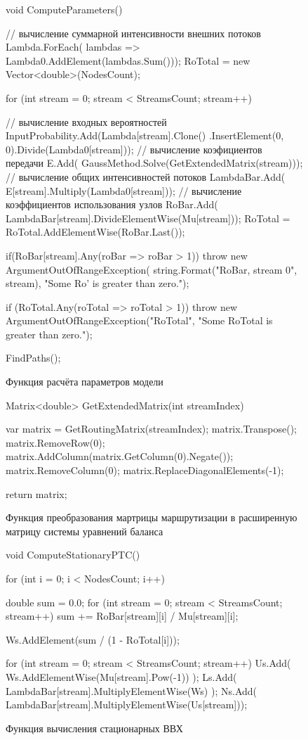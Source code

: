 \documentclass[oneside, draft, 14pt, a4paper]{extreport}
\begin{document}
\begin{figure}[h!]
    \begin{listing}{1}
void ComputeParameters()
{
  // вычисление суммарной интенсивности внешних потоков
  Lambda.ForEach(
	lambdas => Lambda0.AddElement(lambdas.Sum())); 
  RoTotal = new Vector<double>(NodesCount);

  for (int stream = 0; stream < StreamsCount; stream++)
  {
	// вычисление входных вероятностей
	InputProbability.Add(Lambda[stream].Clone()
	  .InsertElement(0, 0).Divide(Lambda0[stream]));
	// вычисление коэфициентов передачи
	E.Add(
	  GaussMethod.Solve(GetExtendedMatrix(stream)));
	// вычисление общих интенсивностей потоков
	LambdaBar.Add(
	  E[stream].Multiply(Lambda0[stream]));
	// вычисление коэффициентов использования узлов
	RoBar.Add(
	  LambdaBar[stream].DivideElementWise(Mu[stream]));
	RoTotal = RoTotal.AddElementWise(RoBar.Last());
	
  	if(RoBar[stream].Any(roBar => roBar > 1))
	  throw new ArgumentOutOfRangeException(
	  string.Format("RoBar, stream {0}", stream),
	  "Some Ro' is greater than zero.");
  }
  if (RoTotal.Any(roTotal => roTotal > 1))
	throw new ArgumentOutOfRangeException("RoTotal",
	"Some RoTotal is greater than zero.");
	
	FindPaths();
}\end{listing}
	
	\caption{Функция расчёта параметров модели}
	\label{pic:function_computeParameters}
\end{figure}

\begin{figure}[h!]
    \begin{listing}{1}
Matrix<double> GetExtendedMatrix(int streamIndex)
{
  var matrix = GetRoutingMatrix(streamIndex);
  matrix.Transpose();
  matrix.RemoveRow(0);
  matrix.AddColumn(matrix.GetColumn(0).Negate());
  matrix.RemoveColumn(0);
  matrix.ReplaceDiagonalElements(-1);

  return matrix;
}\end{listing}
    
    \caption{Функция преобразования мартрицы маршрутизации в расширенную матрицу системы уравнений баланса}
    \label{pic:functions_getextendedmatrix}
\end{figure}

\begin{figure}[h!]
	\begin{listing}{1}
void ComputeStationaryPTC()
{
  for (int i = 0; i < NodesCount; i++)
  {
	double sum = 0.0;
	for (int stream = 0; stream < StreamsCount; stream++)
	  sum += RoBar[stream][i] / Mu[stream][i];

	Ws.AddElement(sum / (1 - RoTotal[i]));
  }

  for (int stream = 0; stream < StreamsCount; stream++)
  {
	Us.Add( Ws.AddElementWise(Mu[stream].Pow(-1)) );
	Ls.Add(
	  LambdaBar[stream].MultiplyElementWise(Ws) );
	Ns.Add(
	  LambdaBar[stream].MultiplyElementWise(Us[stream]));
  }
}\end{listing}

	\caption{Функция вычисления стационарных ВВХ}
	\label{pic:function_computeSPTC}
\end{figure}
\end{document}
